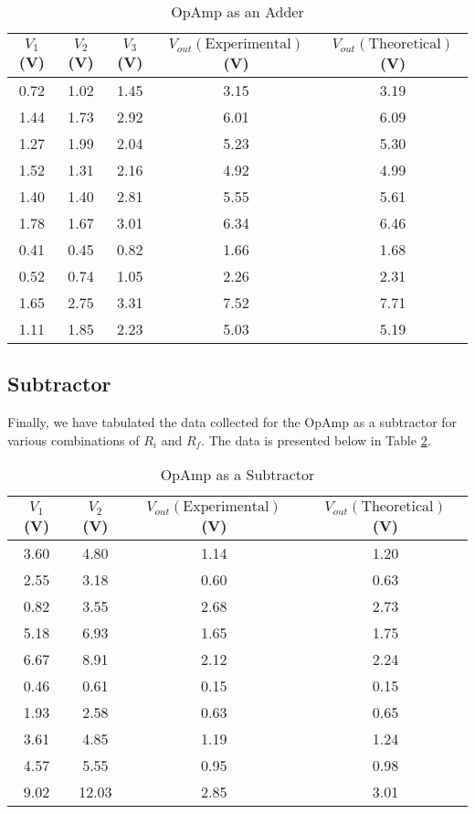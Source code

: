\documentclass[12pt]{article}
\begin{document}
\begin{table}[H]
    \centering
    \begin{tabular}{|c|c|c|c|c|}
        \hline
        $V_1$ (V) & $V_2$ (V) & $V_3$ (V) & $V_{out}(\text{Experimental})$ (V) & $V_{out}(\text{Theoretical})$ (V)  \\
        \hline
        0.72 & 1.02 & 1.45 & 3.15 & 3.19 \\
        1.44 & 1.73 & 2.92 & 6.01 & 6.09 \\
        1.27 & 1.99 & 2.04 & 5.23 & 5.30 \\
        1.52 & 1.31 & 2.16 & 4.92 & 4.99 \\
        1.40 & 1.40 & 2.81 & 5.55 & 5.61 \\
        1.78 & 1.67 & 3.01 & 6.34 & 6.46 \\
        0.41 & 0.45 & 0.82 & 1.66 & 1.68 \\
        0.52 & 0.74 & 1.05 & 2.26 & 2.31 \\
        1.65 & 2.75 & 3.31 & 7.52 & 7.71 \\
        1.11 & 1.85 & 2.23 & 5.03 & 5.19 \\
        \hline
    \end{tabular}
    \caption{OpAmp as an Adder}
    \label{tab:voltage_data_adder}
\end{table}


\subsection*{Subtractor}
Finally, we have tabulated the data collected for the OpAmp as a subtractor for various combinations of $R_i$ and $R_f$. The data is presented below in Table \ref{tab:voltage_data2}.

\begin{table}[H]
  \centering
  \begin{tabular}{|c|c|c|c|}
      \hline
      $V_1$ (V) & $V_2$ (V) & $V_{out}(\text{Experimental})$ (V) & $V_{out}(\text{Theoretical})$ (V) \\
      \hline
      3.60 & 4.80  & 1.14  & 1.20 \\
      2.55 & 3.18  & 0.60  & 0.63 \\
      0.82 & 3.55  & 2.68  & 2.73 \\
      5.18 & 6.93  & 1.65  & 1.75 \\
      6.67 & 8.91  & 2.12  & 2.24 \\
      0.46 & 0.61  & 0.15  & 0.15 \\
      1.93 & 2.58  & 0.63  & 0.65 \\
      3.61 & 4.85  & 1.19  & 1.24 \\
      4.57 & 5.55  & 0.95  & 0.98 \\
      9.02 & 12.03 & 2.85  & 3.01 \\
      \hline
  \end{tabular}
  \caption{OpAmp as a Subtractor}
  \label{tab:voltage_data2}
\end{table}
\end{document}
